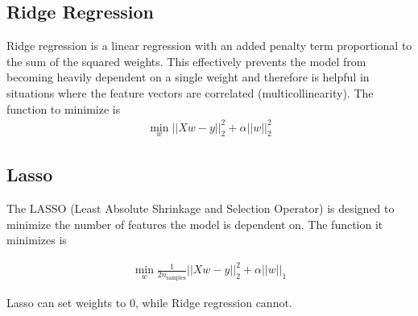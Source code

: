 \subsection{Ridge Regression}
Ridge regression is a linear regression with an added penalty term proportional to the sum of the squared weights. This effectively prevents the model from becoming heavily dependent on a single weight and therefore is helpful in situations where the feature vectors are correlated (multicollinearity). The function to minimize is 
\begin{align}
	\min_w||Xw-y||^2_2 + \alpha||w||^2_2
\end{align}

\subsection{Lasso}
The LASSO (Least Absolute Shrinkage and Selection Operator) is designed to minimize the number of features the model is dependent on. The function it minimizes is 

\begin{align}
	\min_w\frac{1}{2n_{\textrm{samples}}}||Xw-y||^2_2 + \alpha||w||_1
\end{align}

Lasso can set weights to 0, while Ridge regression cannot.


